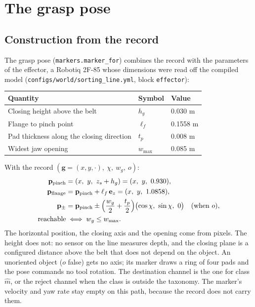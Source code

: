 \documentclass[11pt,a4paper]{article}
\theoremstyle{definition}
\theoremstyle{remark}
\newcommand{\ez}{\mathbf{e}_z}
\newcommand{\code}[1]{\texttt{#1}}
\begin{document}
\section{The grasp pose}
\label{sec:pose}

\subsection{Construction from the record}

The grasp pose (\code{markers.marker\_for}) combines the record with the
parameters of the effector, a Robotiq 2F-85 whose dimensions were read off the
compiled model (\code{configs/world/sorting\_line.yml}, block \code{effector}):

\begin{center}
\begin{tabular}{@{}lll@{}}
\toprule
Quantity & Symbol & Value \\
\midrule
Closing height above the belt & $h_g$ & 0.030 m \\
Flange to pinch point & $\ell_f$ & 0.1558 m \\
Pad thickness along the closing direction & $t_p$ & 0.008 m \\
Widest jaw opening & $w_{\max}$ & 0.085 m \\
\bottomrule
\end{tabular}
\end{center}

With the record $(\mathbf g = (x,y,\cdot),\ \chi,\ w_g,\ o)$:
\begin{align}
\label{eq:pinch}
\mathbf{p}_{\text{pinch}} &= (x,\ y,\ z_s + h_g) = (x,\ y,\ 0.930), \\
\label{eq:flange}
\mathbf{p}_{\text{flange}} &= \mathbf{p}_{\text{pinch}} + \ell_f\,\ez = (x,\ y,\ 1.0858), \\
\label{eq:pads}
\mathbf{p}_{\pm} &= \mathbf{p}_{\text{pinch}} \pm \Bigl(\frac{w_g}{2} + \frac{t_p}{2}\Bigr)\bigl(\cos\chi,\ \sin\chi,\ 0\bigr)
\quad \text{(when } o\text{)}, \\
\text{reachable} &\iff w_g \le w_{\max} .
\end{align}
The horizontal position, the closing axis and the opening come from pixels. The
height does not: no sensor on the line measures depth, and the closing plane is a
configured distance above the belt that does not depend on the object. An
unoriented object ($o$ false) gets no axis; its marker draws a ring of four pads
and the pose commands no tool rotation. The destination channel is the one for
class $\hat m$, or the reject channel when the class is outside the taxonomy. The
marker's velocity and yaw rate stay empty on this path, because the record does
not carry them.
\end{document}
